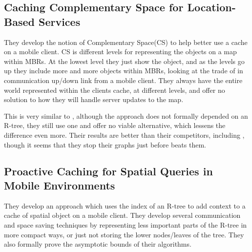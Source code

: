 \subsection{Caching Complementary Space for Location-Based Services}
They develop the notion of Complementary Space(CS) to help better use a cache on a mobile client. CS is different levels for representing the objects on a map within MBRs. At the lowest level they just show the object, and as the levels go up they include more and more objects within MBRs, looking at the trade of in communication up/down link from a mobile client. They always have the entire world represented within the clients cache, at different levels, and offer no solution to how they will handle server updates to the map.

This is very similar to \cite{pcsqm}, although the approach does not formally depended on an R-tree, they still use one and offer no viable alternative, which lessens the difference even more. Their results are better than their competitors, including \cite{pcsqm}, though it seems that they stop their graphs just before \cite{pcsqm} beats them.



\subsection{Proactive Caching for Spatial Queries in Mobile Environments}

They develop an approach which uses the index of an R-tree to add context to a cache of spatial object on a mobile client. They develop several communication and space saving techniques by representing less important parts of the R-tree in more compact ways, or just not storing the lower nodes/leaves of the tree. They also formally prove the asymptotic bounds of their algorithms.

